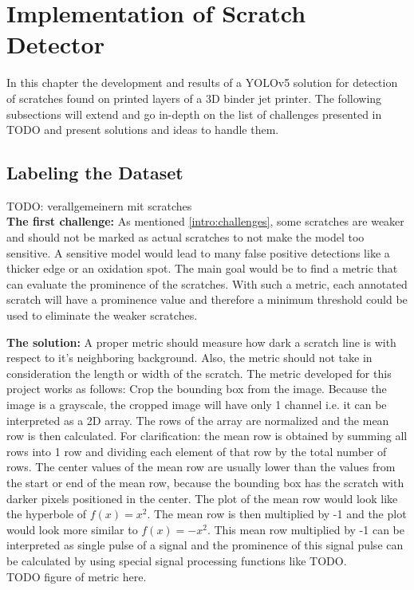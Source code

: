 \section{Implementation of Scratch Detector}
In this chapter the development and results of a YOLOv5 solution for detection of scratches found on printed layers of a 3D binder jet printer. The following subsections will extend and go in-depth on the list of challenges presented in TODO and present solutions and ideas to handle them.

\subsection{Labeling the Dataset}
TODO: verallgemeinern mit scratches \\

\textbf{The first challenge:}
As mentioned \ref{intro:challenges}, some scratches are weaker and should not be marked as actual scratches to not make the model too sensitive. A sensitive model would lead to many false positive detections like a thicker edge or an oxidation spot. The main goal would be to find a metric that can evaluate the prominence of the scratches. With such a metric, each annotated scratch will have a prominence value and therefore a minimum threshold could be used to eliminate the weaker scratches.

\textbf{The solution:}
A proper metric should measure how dark a scratch line is with respect to it's neighboring background. Also, the metric should not take in consideration the length or width of the scratch.
The metric developed for this project works as follows:
Crop the bounding box from the image. Because the image is a grayscale, the cropped image will have only 1 channel i.e. it can be interpreted as a 2D array. The rows of the array are normalized and the mean row is then calculated. For clarification: the mean row is obtained by summing all rows into 1 row and dividing each element of that row by the total number of rows. The center values of the mean row are usually lower than the values from the start or end of the mean row, because the bounding box has the scratch with darker pixels positioned in the center. The plot of the mean row would look like the hyperbole of $f(x)=x^2$. The mean row is then multiplied by -1 and the plot would look more similar to $f(x)=-x^2$. This mean row multiplied by -1 can be interpreted as single pulse of a signal and the prominence of this signal pulse can be calculated by using special signal processing functions like TODO. \\
TODO figure of metric here. \\

